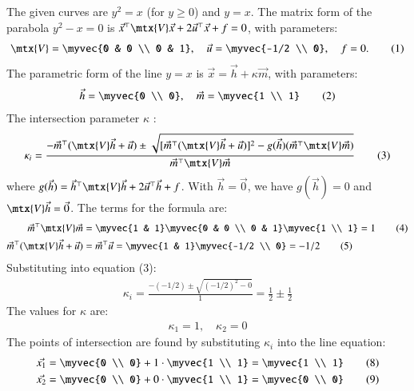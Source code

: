 \documentclass[journal]{IEEEtran}
\begin{document}
\solution
The given curves are $y^2 = x$ (for $y \ge 0$) and $y = x$.
The matrix form of the parabola $y^2 - x = 0$ is $\vec{x}^\top\mtx{V}\vec{x} + 2\vec{u}^\top\vec{x} + f = 0$, with parameters:
\begin{align}
\mtx{V} = \myvec{0 & 0 \\ 0 & 1}, \quad \vec{u} = \myvec{-1/2 \\ 0}, \quad f = 0. \tag{1}
\end{align}
The parametric form of the line $y=x$ is $\vec{x} = \vec{h} + \kappa\vec{m}$, with parameters:
\begin{align}
\vec{h} = \myvec{0 \\ 0}, \quad \vec{m} = \myvec{1 \\ 1} \tag{2}
\end{align}
The intersection parameter $\kappa$ :
\begin{align}
\kappa_i = \frac{-\vec{m}^\top(\mtx{V}\vec{h} + \vec{u}) \pm \sqrt{[\vec{m}^\top(\mtx{V}\vec{h} + \vec{u})]^2 - g(\vec{h})(\vec{m}^\top\mtx{V}\vec{m})}}{\vec{m}^\top\mtx{V}\vec{m}} \tag{3}
\end{align}
where $g(\vec{h}) = \vec{h}^\top\mtx{V}\vec{h} + 2\vec{u}^\top\vec{h} + f$.
With $\vec{h} = \vec{0}$, we have $g(\vec{h}) = 0$ and $\mtx{V}\vec{h} = \vec{0}$.
The terms for the formula are:
\begin{align}
\vec{m}^\top\mtx{V}\vec{m} &= \myvec{1 & 1} \myvec{0 & 0 \\ 0 & 1} \myvec{1 \\ 1} = 1 \tag{4} \\
\vec{m}^\top(\mtx{V}\vec{h} + \vec{u}) &= \vec{m}^\top\vec{u} = \myvec{1 & 1} \myvec{-1/2 \\ 0} = -1/2 \tag{5}
\end{align}
Substituting into equation (3):
\begin{align}
\kappa_i = \frac{-(-1/2) \pm \sqrt{(-1/2)^2 - 0}}{1} = \frac{1}{2} \pm \frac{1}{2} \tag{6}
\end{align}
The values for $\kappa$ are:
\begin{align}
\kappa_1 = 1, \quad \kappa_2 = 0 \tag{7}
\end{align}
The points of intersection are found by substituting $\kappa_i$ into the line equation:
\begin{align}
\vec{x_1} &= \myvec{0 \\ 0} + 1 \cdot \myvec{1 \\ 1} = \myvec{1 \\ 1} \tag{8} \\
\vec{x_2} &= \myvec{0 \\ 0} + 0 \cdot \myvec{1 \\ 1} = \myvec{0 \\ 0} \tag{9}
\end{align}
\end{document}

